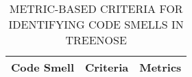 %
%
\begin{table}[t]
    \centering
    \caption{
        \label{tab:metrics-and-thresholds}
       METRIC-BASED CRITERIA FOR IDENTIFYING CODE SMELLS IN TREENOSE
    }
    \renewcommand{\arraystretch}{1.2}
    \begin{tabular}{@{}lll@{}}
        \toprule
            {\bf Code Smell} 
            &
            {\bf Criteria}  
            &
            {\bf Metrics}
            \\



        
        \bottomrule
        
    \end{tabular}
    \vspace{-1em}
\end{table}
